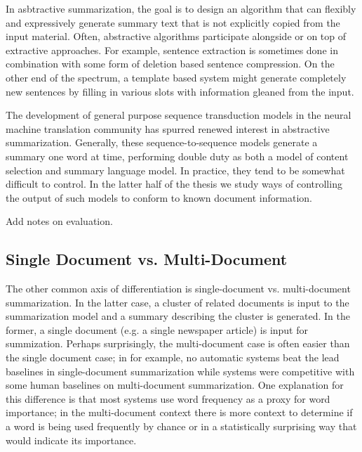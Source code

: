 In asbtractive summarization, the goal is to design an algorithm that
can flexibly and expressively generate summary text that is not explicitly
copied from the input material. Often, abstractive algorithms participate
alongside or on top of extractive approaches.
For example, sentence extraction is sometimes done in combination with some 
form of deletion based sentence compression. On the other end of the spectrum,
a template based system might generate completely new sentences by filling
in various slots with information gleaned from the input. 

The development of general purpose sequence transduction models in the 
neural machine translation community has spurred renewed interest in 
abstractive summarization. Generally, these sequence-to-sequence models
generate a summary one word at time, performing double duty as both a model
of content selection and summary language model. In practice, they tend
to be somewhat difficult to control. In the latter half of the thesis
we study ways of controlling the output of such models to conform to
known document information.


Add notes on evaluation.




\subsection{Single Document vs. Multi-Document}

The other common axis of differentiation is single-document vs. 
multi-document summarization. In the latter case, a cluster of related 
documents is input to the summarization model and a summary describing the 
cluster is generated. In the former, a single document (e.g. a single
newspaper article) is input for summization. Perhaps surprisingly, 
the multi-document case is often easier than the single document case;
in \cite{nenkovaSomething} for example, no automatic systems beat the lead
baselines in single-document summarization while systems were competitive 
with some human baselines on multi-document summarization.
One explanation for this difference is that most systems use word frequency
as a proxy for word importance; in the multi-document context there is more 
context to determine if a word is being used frequently by chance or 
in a statistically surprising way that would indicate its importance.

